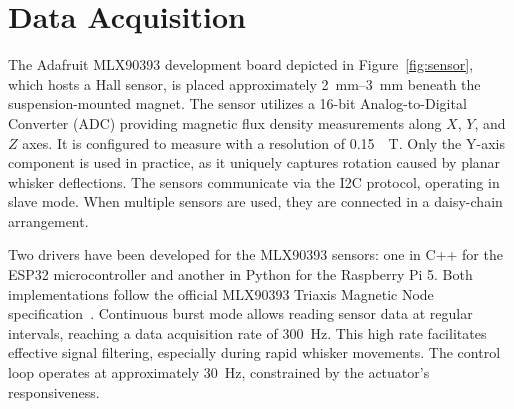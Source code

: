 \section{Data Acquisition}

The Adafruit MLX90393 development board depicted in Figure~\ref{fig:sensor}, which hosts a Hall sensor, is placed approximately \qtyrange{2}{3}{\milli\metre} beneath the suspension-mounted magnet.
The sensor utilizes a 16-bit Analog-to-Digital Converter (ADC) providing magnetic flux density measurements along $X$, $Y$, and $Z$ axes.
It is configured to measure with a resolution of \SI{0.15}{\mu\tesla}.
Only the Y-axis component is used in practice, as it uniquely captures rotation caused by planar whisker deflections.
The sensors communicate via the I2C protocol, operating in slave mode.
When multiple sensors are used, they are connected in a daisy-chain arrangement.

Two drivers have been developed for the MLX90393 sensors: one in C++ for the ESP32 microcontroller and another in Python for the Raspberry Pi 5.
Both implementations follow the official MLX90393 Triaxis Magnetic Node specification~\cite{MLX90393}.
Continuous burst mode allows reading sensor data at regular intervals, reaching a data acquisition rate of \SI{300}{\hertz}.
This high rate facilitates effective signal filtering, especially during rapid whisker movements.
The control loop operates at approximately \SI{30}{\hertz}, constrained by the actuator's responsiveness.


